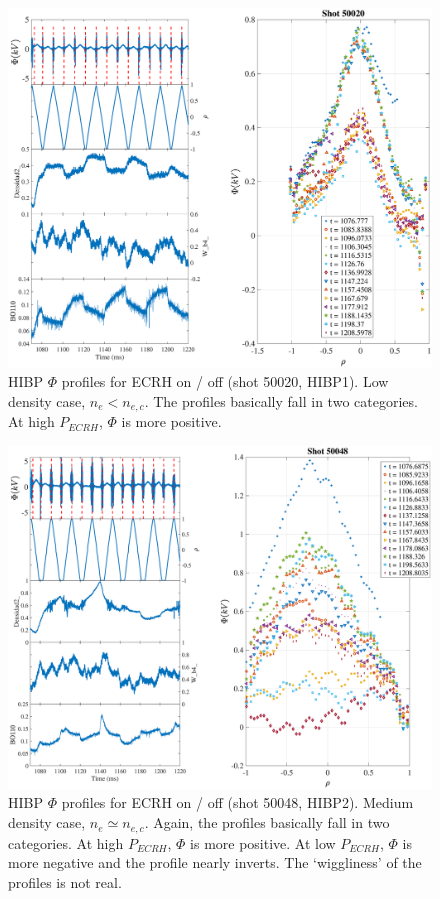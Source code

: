 \documentclass[preprint,12pt,authoryear]{elsarticle}
\begin{document}
\begin{figure}[!ht]
\centering
   \includegraphics[width=0.9\columnwidth]{Images/HIBP_Phi.eps}
   \caption{HIBP $\Phi$ profiles for ECRH on / off (shot 50020, HIBP1). Low density case, $n_e < n_{e,c}$. The profiles basically fall in two categories. At high $P_{ECRH}$, $\Phi$ is more positive.}
   \label{Fig:HIBP_Phi}
\end{figure}

\begin{figure}[!ht]
\centering
   \includegraphics[width=0.9\columnwidth]{Images/HIBP_Phi2.eps}
   \caption{HIBP $\Phi$ profiles for ECRH on / off (shot 50048, HIBP2). Medium density case, $n_e \simeq n_{e,c}$. Again, the profiles basically fall in two categories. At high $P_{ECRH}$, $\Phi$ is more positive. At low $P_{ECRH}$, $\Phi$ is more negative and the profile nearly inverts. The `wiggliness' of the profiles is not real.}
   \label{Fig:HIBP_Phi2}
\end{figure}
\end{document}
